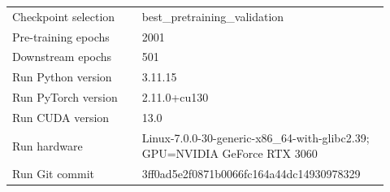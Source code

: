 \begin{table}[p]
\begin{tabular}{p{0.32\linewidth}p{0.60\linewidth}}
Checkpoint selection & best\_pretraining\_validation \\
Pre-training epochs & 2001 \\
Downstream epochs & 501 \\
Run Python version & 3.11.15 \\
Run PyTorch version & 2.11.0+cu130 \\
Run CUDA version & 13.0 \\
Run hardware & Linux-7.0.0-30-generic-x86\_64-with-glibc2.39; GPU=NVIDIA GeForce RTX 3060 \\
Run Git commit & 3ff0ad5e2f0871b0066fc164a44dc14930978329 \\
\bottomrule
\end{tabular}
\end{table}
